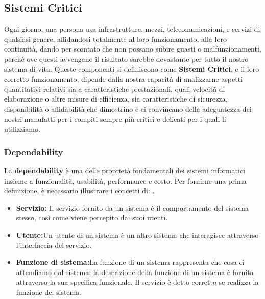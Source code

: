 \documentclass[14pt]{extarticle}
\begin{document}
\subsection{Sistemi Critici}
Ogni giorno, una persona usa infrastrutture, mezzi, telecomunicazioni, e servizi di qualsiasi genere, affidandosi totalmente al loro funzionamento, alla loro continuità, dando per scontato che non possano subire guasti o malfunzionamenti, perché ove questi avvengano il risultato sarebbe devastante per tutto il nostro sistema di vita. Queste componenti si definiscono come \textbf{Sistemi Critici}, e  il loro corretto funzionamento, dipende dalla nostra capacità di analizzarne aspetti quantitativi relativi sia a caratteristiche prestazionali, quali velocità di elaborazione o altre misure di efficienza,
sia caratteristiche di sicurezza, disponibilità o affidabilità che dimostrino e ci
convincano della adeguatezza dei nostri manufatti per i compiti sempre più
critici e delicati per i quali li utilizziamo.

\subsubsection{Dependability}
La \textbf{dependability} è una delle proprietà fondamentali dei sistemi informatici insieme a funzionalità, usabilità, performance e costo. Per fornirne una prima definizione, è necessario illustrare i concetti di: \cite{avizienis2004basic}.
\begin{itemize}
\item \textbf{Servizio:} Il servizio fornito da un sistema è il comportamento del sistema stesso, così come viene percepito dai suoi utenti.
\item \textbf{Utente:}Un utente di un sistema è un altro sistema che interagisce attraverso l'interfaccia del servizio.
\item \textbf{Funzione di sistema:}La funzione di un sistema rappresenta che cosa ci attendiamo dal sistema; la descrizione della funzione di un sistema è fornita attraverso la sua specifica funzionale. Il servizio è detto corretto se realizza la funzione del sistema.
\end{itemize}
\end{document}
